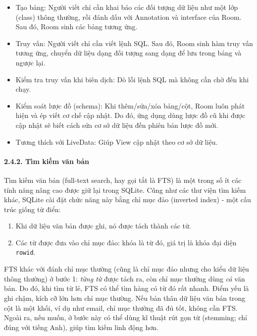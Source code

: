 \documentclass[
]{article}
\begin{document}
\begin{itemize}
\item
  Tạo bảng: Người viết chỉ cần khai báo các đối tượng dữ liệu như một
  lớp (class) thông thường, rồi đánh dấu với Annotation và interface của
  Room. Sau đó, Room sinh các bảng tương ứng.
\item
  Truy vấn: Người viết chỉ cần viết lệnh SQL. Sau đó, Room sinh hàm truy
  vấn tương ứng, chuyển dữ liệu dạng đối tượng sang dạng để lưu trong
  bảng và ngược lại.
\item
  Kiểm tra truy vấn khi biên dịch: Dò lỗi lệnh SQL mà không cần chờ đến
  khi chạy.
\item
  Kiểm soát lược đồ (schema): Khi thêm/sửa/xóa bảng/cột, Room luôn phát
  hiện và ép viết cơ chế cập nhật. Do đó, ứng dụng dùng lược đồ cũ khi
  được cập nhật sẽ biết cách sửa cơ sở dữ liệu đến phiên bản lược đồ
  mới.
\item
  Tương thích với LiveData: Giúp View cập nhật theo cơ sở dữ liệu.
\end{itemize}

\hypertarget{tuxecm-kiux1ebfm-vux103n-bux1ea3n}{%
\paragraph{\texorpdfstring{2.4.2. Tìm kiếm văn bản
}{2.4.2. Tìm kiếm văn bản }}\label{tuxecm-kiux1ebfm-vux103n-bux1ea3n}}

Tìm kiếm văn bản (full-text search, hay gọi tắt là FTS) là một trong số
ít các tính năng nâng cao được giữ lại trong SQLite. Cũng như các thư
viện tìm kiếm khác, SQLite cài đặt chức năng này bằng chỉ mục đảo
(inverted index) - một cấu trúc giống từ điển:

\begin{enumerate}
\def\labelenumi{\arabic{enumi}.}
\item
  Khi dữ liệu văn bản được ghi, nó được tách thành các từ.
\item
  Các từ được đưa vào chỉ mục đảo: khóa là từ đó, giá trị là khóa đại
  diện \texttt{rowid}.
\end{enumerate}

FTS khác với đánh chỉ mục thường (cũng là chỉ mục đảo nhưng cho kiểu dữ
liệu thông thường) ở bước 1: \emph{từng từ} được tách ra, còn chỉ mục
thường dùng \emph{cả} văn bản. Do đó, khi tìm từ lẻ, FTS có thể tìm hàng
có từ đó rất nhanh. Điểm yếu là ghi chậm, kích cỡ lớn hơn chỉ mục
thường. Nếu bản thân dữ liệu văn bản trong cột là một khối, ví dụ như
email, chỉ mục thường đã đủ tốt, không cần FTS. Ngoài ra, nếu muốn, ở
bước này có thể dùng kĩ thuật rút gọn từ (stemming; chỉ đúng với tiếng
Anh), giúp tìm kiếm linh động hơn.
\end{document}
